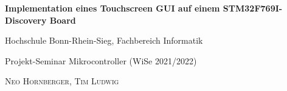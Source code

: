 \documentclass[a4paper,singleside,12pt,titlepage]{scrartcl}
\begin{document}
	    \begin{titlepage}
		
		\hspace*{0pt}
		\vfill
		\begin{center}
			{\Huge\textbf{Implementation eines Touchscreen GUI auf einem STM32F769I-Discovery Board}}\par
			\bigskip
			\bigskip
			{\large Hochschule Bonn-Rhein-Sieg, Fachbereich Informatik}\par
			{\large Projekt-Seminar Mikrocontroller (WiSe 2021/2022)}\par
			\bigskip
			\bigskip
			\bigskip
			\bigskip
			\bigskip
			\textsc{Neo Hornberger, Tim Ludwig}\par
		\end{center}
		\vfill
		\hspace*{0pt}
	\end{titlepage}

	\tableofcontents
	\listoffigures
	\newpage
	
	
	
	
	
	
	\newpage
	\printbibliography[heading=bibnumbered]
\end{document}
